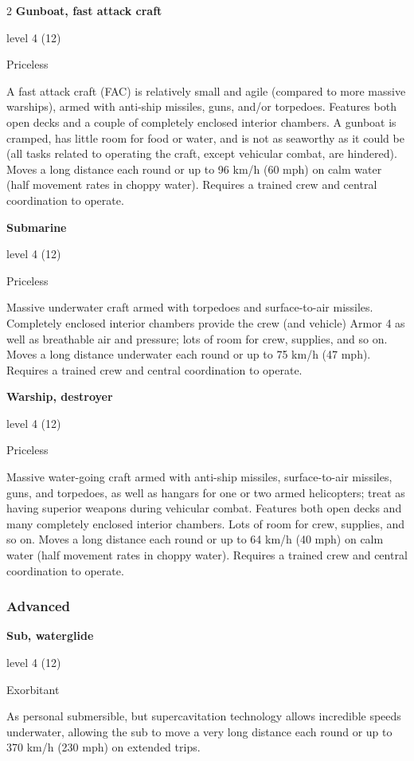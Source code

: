 \begin{multicols}{2}
\textbf{Gunboat, fast attack craft}

level 4 (12) 

Priceless 

A fast attack craft (FAC) is relatively small and agile (compared to more massive warships), armed with anti-ship missiles, guns, and/or torpedoes. Features both open decks and a couple of completely enclosed interior chambers. A gunboat is cramped, has little room for food or water, and is not as seaworthy as it could be (all tasks related to operating the craft, except vehicular combat, are hindered). Moves a long distance each round or up to 96 km/h (60 mph) on calm water (half movement rates in choppy water). Requires a trained crew and central coordination to operate.

\textbf{Submarine} 

level 4 (12) 

Priceless 

Massive underwater craft armed with torpedoes and surface-to-air missiles. Completely enclosed interior chambers provide the crew (and vehicle) Armor 4 as well as breathable air and pressure; lots of room for crew, supplies, and so on. Moves a long distance underwater each round or up to 75 km/h (47 mph). Requires a trained crew and central coordination to operate. 

\textbf{Warship, destroyer} 

level 4 (12) 

Priceless 

Massive water-going craft armed with anti-ship missiles, surface-to-air missiles, guns, and torpedoes, as well as hangars for one or two armed helicopters; treat as having superior weapons during vehicular combat. Features both open decks and many completely enclosed interior chambers. Lots of room for crew, supplies, and so on. Moves a long distance each round or up to 64 km/h (40 mph) on calm water (half movement rates in choppy water). Requires a trained crew and central coordination to operate.

\subsubsection{Advanced}

\textbf{Sub, waterglide} 

level 4 (12) 

Exorbitant 

As personal submersible, but supercavitation technology allows incredible speeds underwater, allowing the sub to move a very long distance each round or up to 370 km/h (230 mph) on extended trips. 


\end{multicols}
